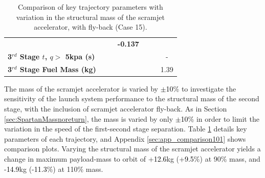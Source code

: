 \begin{table}[ht]
\begin{tabular}{l c c c c c c}
	& \textbf{\thirddExergyEffmSPARTANOneHundredFive}
	& \textbf{\thirddExergyEffmSPARTANOneHundredTen}
	& \textbf{-0.137}
	\\
	\textbf{3$^{rd}$ Stage $t$, $q >$ 5kpa (s)}
	& \thirdqOverFivemSPARTANNinety
	& \thirdqOverFivemSPARTANNinetyFive
	& \thirdqOverFivemSPARTANStandard
	& \thirdqOverFivemSPARTANOneHundredFive
	& \thirdqOverFivemSPARTANOneHundredTen
	& -
	\\
	\textbf{3$^{rd}$ Stage Fuel Mass (kg)}
	& \thirdmFuelmSPARTANNinety
	& \thirdmFuelmSPARTANNinetyFive
	& \thirdmFuelmSPARTANStandard
	& \thirdmFuelmSPARTANOneHundredFive
	& \thirdmFuelmSPARTANOneHundredTen
	&1.39
	\\
	\hline 
\end{tabular} 
\caption{Comparison of key trajectory parameters with variation in the structural mass of the scramjet accelerator, with fly-back (Case 15).}
\label{tab:comparison101}
\end{table}



The mass of the scramjet accelerator is varied by \textcolor{black}{$\pm$10}\% to investigate the sensitivity of the launch system performance to the structural mass of the second stage, with the inclusion of scramjet accelerator fly-back. As in Section \ref{sec:SpartanMassnoreturn}, the mass is varied by only \textcolor{black}{$\pm$10}\% in order to limit the variation in the speed of the first-second stage separation.
Table \ref{tab:comparison101} details key parameters of each trajectory, and Appendix \ref{sec:app_comparison101} shows comparison plots.
Varying the structural mass of the scramjet accelerator yields a change in maximum payload-mass to orbit of +\textcolor{black}{12.6}kg (+\textcolor{black}{9.5}\%) at 90\% mass, and -\textcolor{black}{14.9}kg (-\textcolor{black}{11.3}\%) at 110\% mass. 


